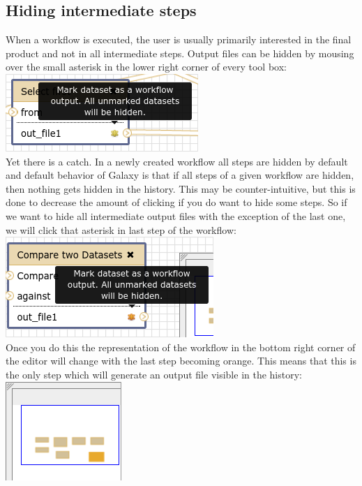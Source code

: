 \documentclass[11pt,a4paper]{article}
\begin{document}
\subsection{Hiding intermediate steps}
When a workflow is executed, the user is usually primarily interested in the final product and not in all intermediate steps. Output files can be hidden by mousing over the small asterisk in the lower right corner of every tool box:\\
\includegraphics[scale=0.55]{figures/101_29}\\
Yet there is a catch. In a newly created workflow all steps are hidden by default and default behavior of Galaxy is that if all steps of a given workflow are hidden, then nothing gets hidden in the history. This may be
counter-intuitive, but this is done to decrease the amount of clicking if you do want to hide some steps. So if we want to hide all intermediate output files with the exception of the last one, we will click that asterisk
in last step of the workflow:\\
\includegraphics[scale=0.55]{figures/101_30}\\
Once you do this the representation of the workflow in the bottom right corner of the editor will change with the last step becoming orange. This means that this is the only step which will generate an output file visible in the history:\\
\includegraphics[scale=0.55]{figures/101_31}\\
\end{document}
